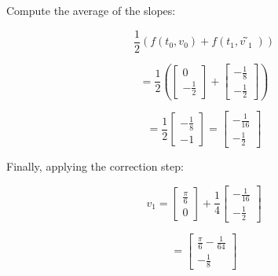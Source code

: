 \documentclass[12pt]{article}
\begin{document}
\begin{enumerate}
\begin{enumerate}
    Compute the average of the slopes:

    \[
    \frac{1}{2} \left( f(t_0, v_0) + f(t_1, ṽ_1) \right)
    \]

    \[
    =
    \frac{1}{2} \left( 
    \begin{bmatrix}
    0 \\
    -\frac{1}{2}
    \end{bmatrix}
    + 
    \begin{bmatrix}
    -\frac{1}{8} \\
    -\frac{1}{2}
    \end{bmatrix}
    \right)
    \]

    \[
    =
    \frac{1}{2}
    \begin{bmatrix}
    -\frac{1}{8} \\
    -1
    \end{bmatrix}
    =
    \begin{bmatrix}
    -\frac{1}{16} \\
    -\frac{1}{2}
    \end{bmatrix}
    \]

    Finally, applying the correction step:

    \[
    v_1 = 
    \begin{bmatrix}
    \frac{\pi}{6} \\
    0
    \end{bmatrix}
    + \frac{1}{4}
    \begin{bmatrix}
    -\frac{1}{16} \\
    -\frac{1}{2}
    \end{bmatrix}
    \]

    \[
    =
    \begin{bmatrix}
    \frac{\pi}{6} - \frac{1}{64} \\
    -\frac{1}{8}
    \end{bmatrix}
    \]

\end{enumerate}


\end{enumerate}
\end{document}

